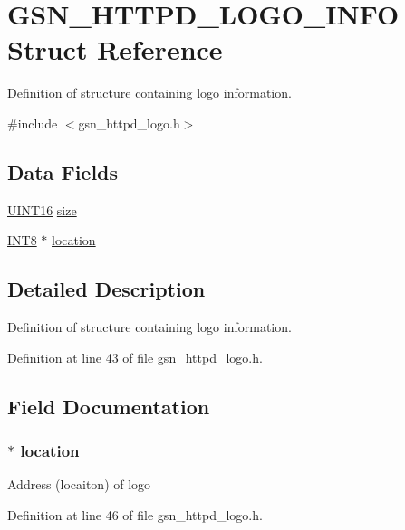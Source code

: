 \hypertarget{a00096}{
\section{GSN\_\-HTTPD\_\-LOGO\_\-INFO Struct Reference}
\label{a00096}
}


Definition of structure containing logo information.  




{\ttfamily \#include $<$gsn\_\-httpd\_\-logo.h$>$}

\subsection*{Data Fields}
\begin{DoxyCompactItemize}
\item 
\hyperlink{a00660_ga09f1a1fb2293e33483cc8d44aefb1eb1}{UINT16} \hyperlink{a00096_a68890417cb73114517d0d8c594bd282e}{size}
\item 
\hyperlink{a00660_ga307b8734c020247f6bac4fcde0dcfbb9}{INT8} $\ast$ \hyperlink{a00096_a86d299488f6779fcadab43d799a3aad5}{location}
\end{DoxyCompactItemize}


\subsection{Detailed Description}
Definition of structure containing logo information. 

Definition at line 43 of file gsn\_\-httpd\_\-logo.h.



\subsection{Field Documentation}
\hypertarget{a00096_a86d299488f6779fcadab43d799a3aad5}{
\subsubsection[{location}]{$\ast$ {\bf location}}}
\label{a00096_a86d299488f6779fcadab43d799a3aad5}
Address (locaiton) of logo 

Definition at line 46 of file gsn\_\-httpd\_\-logo.h.

